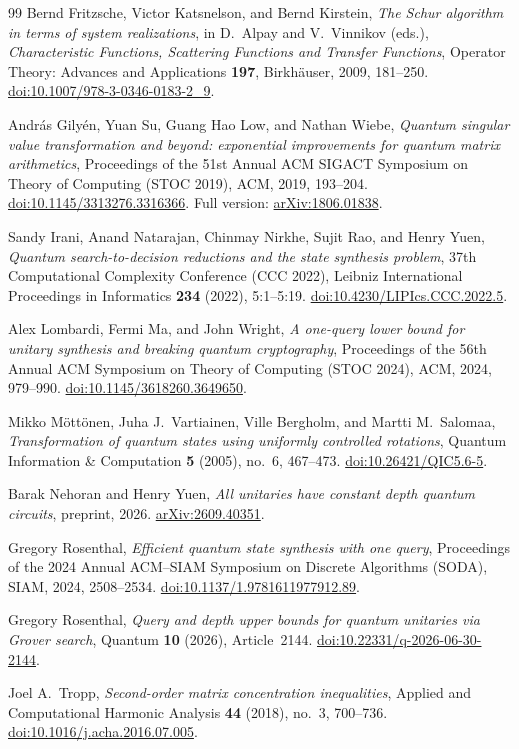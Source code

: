 \begin{thebibliography}{99}
Bernd Fritzsche, Victor Katsnelson, and Bernd Kirstein,
\emph{The Schur algorithm in terms of system realizations},
in D.~Alpay and V.~Vinnikov (eds.),
\emph{Characteristic Functions, Scattering Functions and Transfer Functions},
Operator Theory: Advances and Applications \textbf{197},
Birkh\"auser, 2009, 181--250.
\href{https://doi.org/10.1007/978-3-0346-0183-2_9}{doi:10.1007/978-3-0346-0183-2\_9}.

Andr\'as Gily\'en, Yuan Su, Guang Hao Low, and Nathan Wiebe,
\emph{Quantum singular value transformation and beyond:
exponential improvements for quantum matrix arithmetics},
Proceedings of the 51st Annual ACM SIGACT Symposium on Theory of Computing
(STOC 2019), ACM, 2019, 193--204.
\href{https://doi.org/10.1145/3313276.3316366}{doi:10.1145/3313276.3316366}.
Full version: \href{https://arxiv.org/abs/1806.01838}{arXiv:1806.01838}.

Sandy Irani, Anand Natarajan, Chinmay Nirkhe, Sujit Rao, and Henry Yuen,
\emph{Quantum search-to-decision reductions and the state synthesis problem},
37th Computational Complexity Conference (CCC 2022),
Leibniz International Proceedings in Informatics \textbf{234} (2022),
5:1--5:19.
\href{https://doi.org/10.4230/LIPIcs.CCC.2022.5}{doi:10.4230/LIPIcs.CCC.2022.5}.

Alex Lombardi, Fermi Ma, and John Wright,
\emph{A one-query lower bound for unitary synthesis and breaking quantum cryptography},
Proceedings of the 56th Annual ACM Symposium on Theory of Computing
(STOC 2024), ACM, 2024, 979--990.
\href{https://doi.org/10.1145/3618260.3649650}{doi:10.1145/3618260.3649650}.

Mikko M\"ott\"onen, Juha J.\ Vartiainen, Ville Bergholm, and Martti M.\ Salomaa,
\emph{Transformation of quantum states using uniformly controlled rotations},
Quantum Information \& Computation \textbf{5} (2005), no.~6, 467--473.
\href{https://doi.org/10.26421/QIC5.6-5}{doi:10.26421/QIC5.6-5}.

Barak Nehoran and Henry Yuen,
\emph{All unitaries have constant depth quantum circuits},
preprint, 2026.
\href{https://arxiv.org/abs/2609.40351}{arXiv:2609.40351}.

Gregory Rosenthal,
\emph{Efficient quantum state synthesis with one query},
Proceedings of the 2024 Annual ACM--SIAM Symposium on Discrete Algorithms
(SODA), SIAM, 2024, 2508--2534.
\href{https://doi.org/10.1137/1.9781611977912.89}{doi:10.1137/1.9781611977912.89}.

Gregory Rosenthal,
\emph{Query and depth upper bounds for quantum unitaries via Grover search},
Quantum \textbf{10} (2026), Article~2144.
\href{https://doi.org/10.22331/q-2026-06-30-2144}{doi:10.22331/q-2026-06-30-2144}.

Joel A.\ Tropp,
\emph{Second-order matrix concentration inequalities},
Applied and Computational Harmonic Analysis \textbf{44} (2018), no.~3,
700--736.
\href{https://doi.org/10.1016/j.acha.2016.07.005}{doi:10.1016/j.acha.2016.07.005}.

\end{thebibliography}
